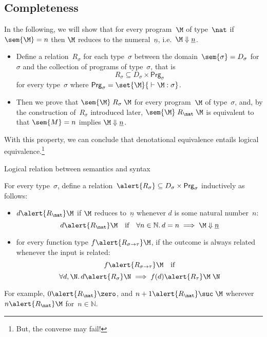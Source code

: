 \subsection{Completeness}
\begin{frame}
  In the following, we will show that for every program~$\M$ of type~$\nat$ if
  $\sem{\M} = n$ then $\M$ reduces to the numeral~$\underline{n}$, i.e.\ $\M
  \Downarrow \underline{n}$. 
  \begin{itemize}
    \item Define a relation~$R_\sigma$ for each type~$\sigma$ between the
      domain~$\sem{\sigma} = D_\sigma$ for~$\sigma$ and the collection of
      programs of type~$\sigma$, that is
      \[
        R_\sigma \subseteq D_\sigma \times \mathsf{Prg}_\sigma
      \]
      for every type~$\sigma$ where $\mathsf{Prg}_\sigma = \set{ \M }{{}\vdash
        \M : \sigma}$.
    \item Then we prove that $\sem{\M}\mathrel{R_\sigma} \M$ for every
      program~$\M$ of type~$\sigma$, and, by the construction of~$R_\sigma$
      introduced later, $\sem{\M} \mathrel{R_\nat} \M$ is equivalent to that
      $\sem{M} = n$ implies $\M \Downarrow \underline{n}$. 
  \end{itemize}
  With this property, we can conclude that denotational equivalence entails
  logical equivalence.\footnote{
    But, the converse may fail! 
  }
\end{frame}
\begin{frame}{Logical relation between semantics and syntax}
\begin{definition}
  For every type~$\sigma$, define a relation~$\alert{R_\sigma} \subseteq
  D_\sigma \times \mathsf{Prg}_\sigma$ inductively as follows:
  \begin{itemize}
    \item $d \alert{\mathrel{R_\nat}}\M$
      if $\M$ reduces to~$\underline{n}$
      whenever $d$ is some natural number~$n$:
      \[
        d \alert{\mathrel{R_\nat}} \M
        \quad\text{if}\quad \forall n \in \mathbb{N}.\,
        d = n \implies \M \Downarrow \underline{n}
      \]
    \item for every function type $f \alert{\mathrel{R_{\sigma\to\tau}}} \M$,
      if the outcome is always related whenever the input is related:
      \[
        f \alert{\mathrel{R_{\sigma\to\tau}}} \M
        \quad\text{if}
      \]
      \[
        \forall d, 
        \N.\, 
        d \alert{\mathrel{R}_\sigma} \N \implies f(d) \alert{\mathrel{R_\tau}} \M\;\N
      \]
  \end{itemize}
\end{definition}
For example, $0 \alert{\mathrel{R_\nat}} \zero$, and
$n + 1 \alert{\mathrel{R_\nat}}
\suc\;\M$ wherever $n \alert{\mathrel{R_\nat}} \M$ for~$n \in \mathbb{N}$. 

\end{frame}

